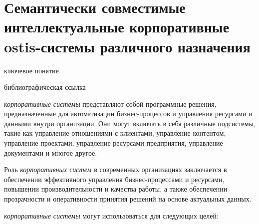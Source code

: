 \section{Семантически совместимые интеллектуальные корпоративные ostis-системы различного назначения}
{\label{sec_corporate_ostis_system}} 

\begin{SCn}

\begin{scnrelfromlist}{ключевое понятие}
\end{scnrelfromlist}

\bigskip

\begin{scnrelfromlist}{библиографическая ссылка}
\end{scnrelfromlist}

\end{SCn}

\textit{корпоративные системы} представляют собой программные решения, предназначенные для автоматизации бизнес-процессов и управления ресурсами и данными внутри организации. Они могут включать в себя различные подсистемы, такие как управление отношениями с клиентами, управление контентом, управление проектами, управление ресурсами предприятия, управление документами и многое другое.

Роль \textit{корпоративных систем} в современных организациях заключается в обеспечении эффективного управления бизнес-процессами и ресурсами, повышении производительности и качества работы, а также обеспечении прозрачности и оперативности принятия решений на основе актуальных данных.

\textit{корпоративные системы} могут использоваться для следующих целей:

